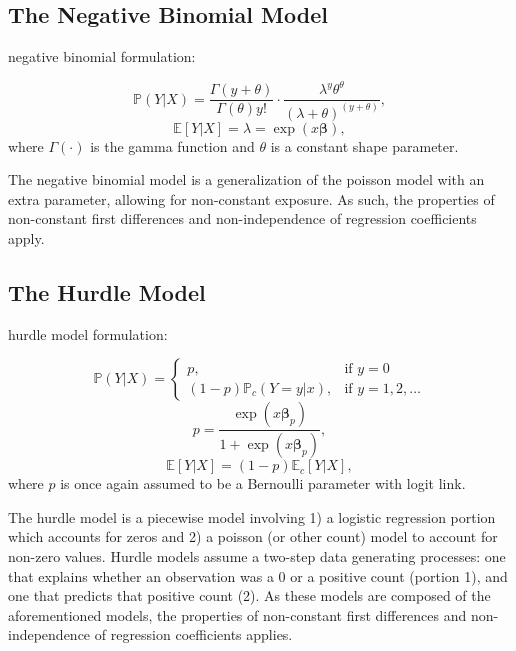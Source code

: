 \documentclass[jou, apacite]{apa6}
\begin{document}
\subsection{The Negative Binomial Model}

negative binomial formulation:

\begin{equation}
\mathbb{P}(Y|X) = \dfrac{\Gamma(y + \theta)}{\Gamma(\theta)y!}
  \cdot
  \dfrac{\lambda^{y}\theta^{\theta}}{(\lambda + \theta)^{(y + \theta)}},
\end{equation}
\begin{equation}
\mathbb{E}[Y|X] = \lambda = \exp (x \bm{\beta}),
\end{equation}
where $\Gamma(\cdot)$ is the gamma function and $\theta$ is a constant shape parameter.

The negative binomial model is a generalization of the poisson model with an extra parameter, allowing for non-constant exposure. As such, the properties of non-constant first differences and non-independence of regression coefficients apply. 


\subsection{The Hurdle Model}

hurdle model formulation:

\begin{equation}
\mathbb{P}(Y|X) =
  \begin{cases}
    p, & \text{if } y = 0 \\
    (1 - p)\mathbb{P}_c(Y = y|x), & \text{if } y = 1, 2, \dots
  \end{cases}
\end{equation}
\begin{equation}
p = \dfrac{\exp (x \bm{\beta}_{p})}{1 + \exp (x \bm{\beta}_{p})},
\end{equation}
\begin{equation}
\mathbb{E}[Y|X] = (1 - p)\mathbb{E}_c[Y|X], %
\end{equation}
where $p$ is once again assumed to be a Bernoulli parameter with logit link.

The hurdle model is a piecewise model involving 1) a logistic regression portion which accounts for zeros and 2) a poisson (or other count) model to account for non-zero values. Hurdle models assume a two-step data generating processes: one that explains whether an observation was a 0 or a positive count (portion 1), and one that predicts that positive count (2). As these models are composed of the aforementioned models, the properties of non-constant first differences and non-independence of regression coefficients applies. 
\end{document}
